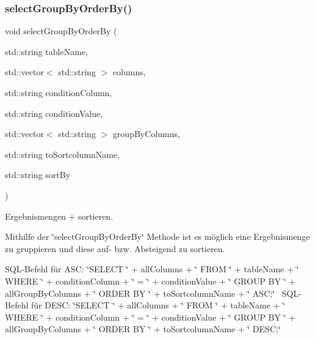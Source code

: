\subsubsection{select\+Group\+By\+Order\+By()}
{\footnotesize\ttfamily void select\+Group\+By\+Order\+By (\begin{DoxyParamCaption}\item[{std\+::string}]{table\+Name,  }\item[{std\+::vector$<$ std\+::string $>$}]{columns,  }\item[{std\+::string}]{condition\+Column,  }\item[{std\+::string}]{condition\+Value,  }\item[{std\+::vector$<$ std\+::string $>$}]{group\+By\+Columns,  }\item[{std\+::string}]{to\+Sortcolumn\+Name,  }\item[{std\+::string}]{sort\+By }\end{DoxyParamCaption})}



Ergebnismengen + sortieren. 

Mithilfe der \char`\"{}select\+Group\+By\+Order\+By\char`\"{} Methode ist es möglich eine Ergebnismenge zu gruppieren und diese auf-\/ bzw. Absteigend zu sortieren.~\newline


S\+Q\+L-\/\+Befehl für A\+SC\+: \char`\"{}\+S\+E\+L\+E\+C\+T \char`\"{} + all\+Columns + \char`\"{} F\+R\+O\+M \char`\"{} + table\+Name + \char`\"{} W\+H\+E\+R\+E \char`\"{} + condition\+Column + \char`\"{} = \textquotesingle{}\char`\"{} + condition\+Value + \char`\"{}\textquotesingle{} G\+R\+O\+U\+P B\+Y \char`\"{} + all\+Group\+By\+Columns + \char`\"{} O\+R\+D\+E\+R B\+Y \char`\"{} + to\+Sortcolumn\+Name + \char`\"{} A\+S\+C;\char`\"{}~\newline
 S\+Q\+L-\/\+Befehl für D\+E\+SC\+: \char`\"{}\+S\+E\+L\+E\+C\+T \char`\"{} + all\+Columns + \char`\"{} F\+R\+O\+M \char`\"{} + table\+Name + \char`\"{} W\+H\+E\+R\+E \char`\"{} + condition\+Column + \char`\"{} = \textquotesingle{}\char`\"{} + condition\+Value + \char`\"{}\textquotesingle{} G\+R\+O\+U\+P B\+Y \char`\"{} + all\+Group\+By\+Columns + \char`\"{} O\+R\+D\+E\+R B\+Y \char`\"{} + to\+Sortcolumn\+Name + \char`\"{} D\+E\+S\+C;\char`\"{}~\newline



